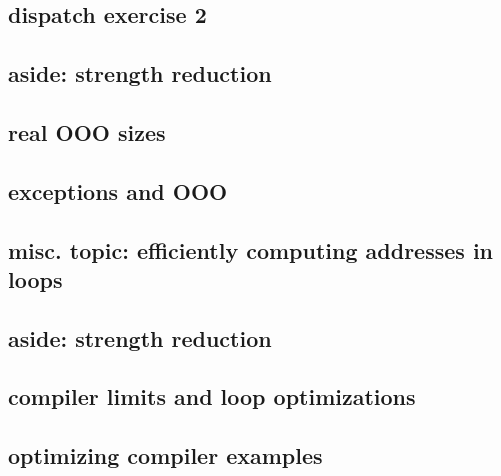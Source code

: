 \subsection{dispatch exercise 2}

\subsection{aside: strength reduction}


\subsection{real OOO sizes}


\subsection{exceptions and OOO}



\subsection{misc. topic: efficiently computing addresses in loops}


\subsection{aside: strength reduction}


\subsection{compiler limits and loop optimizations}

\subsection{optimizing compiler examples}





